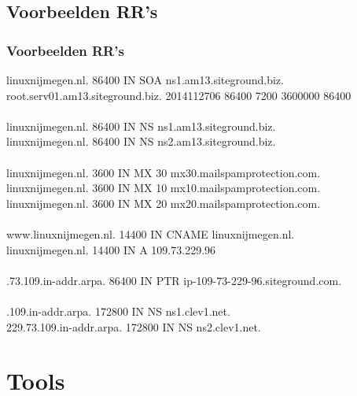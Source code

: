 \subsection{Voorbeelden RR's}
\begin{styleframefrag}
        \frametitle{Voorbeelden RR's}
{\scriptsize
linuxnijmegen.nl.  86400  IN   SOA   ns1.am13.siteground.biz.  root.serv01.am13.siteground.biz. 2014112706 86400 7200 3600000 86400
~\\
~\\
\pause
linuxnijmegen.nl.       86400   IN      NS      ns1.am13.siteground.biz.\\
linuxnijmegen.nl.       86400   IN      NS      ns2.am13.siteground.biz.
~\\
~\\
\pause
linuxnijmegen.nl.       3600    IN      MX      30 mx30.mailspamprotection.com.\\
linuxnijmegen.nl.       3600    IN      MX      10 mx10.mailspamprotection.com.\\
linuxnijmegen.nl.       3600    IN      MX      20 mx20.mailspamprotection.com.
~\\
~\\
\pause
www.linuxnijmegen.nl.   14400    IN      CNAME   linuxnijmegen.nl.\\
linuxnijmegen.nl.       14400    IN      A       109.73.229.96
~\\
~\\
.73.109.in-addr.arpa. 86400 IN    PTR     ip-109-73-229-96.siteground.com.
~\\
~\\
.109.in-addr.arpa. 172800 IN      NS      ns1.clev1.net.\\
229.73.109.in-addr.arpa. 172800 IN      NS      ns2.clev1.net.
}
\end{styleframefrag}

\section{Tools}
